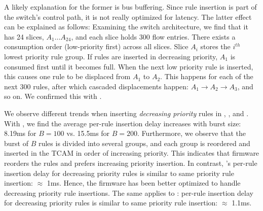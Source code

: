 A likely explanation for the former is bus buffering. Since rule insertion is
part of the switch's control path, it is not really optimized for latency.
The latter effect can be explained as follows: Examining the \Intel switch
architecture, we find that it has 24 slices, $A_1\ldots A_{24}$, and each
slice holds 300 flow entries. There exists a consumption order (low-priority
first) across all slices.  Slice $A_i$ stores the $i^{th}$ lowest
priority rule group. If rules are inserted in decreasing priority, $A_1$ is
consumed first until it becomes full. When the next low priority rule is
inserted, this causes one rule to be displaced from $A_1$ to $A_2$.  This
happens for each of the next 300 rules, after which cascaded displacements
happen: $A_1 \rightarrow A_2 \rightarrow A_3$, and so on. We confirmed this
with \Intel.

We observe different trends when inserting {\em decreasing priority} rules
in \BroadcomOne, \BroadcomThree, and \Intel. With \BroadcomOne, we find the
average per-rule insertion delay increases with burst size: 8.19ms for $B=100$
vs. 15.5ms for $B=200$. Furthermore, we observe that the burst of $B$ rules is
divided into several groups, and each group is reordered and inserted in the
TCAM in order of increasing priority. This indicates that \BroadcomOne
firmware reorders the rules and prefers increasing priority insertion.  In
contrast, \BroadcomThree's per-rule insertion delay for decreasing priority
rules is similar to same priority rule insertion: $\approx$ 1ms. Hence, the
\BroadcomThree firmware has been better optimized to handle decreasing
priority rule insertions. The same applies to \Intel: per-rule insertion delay
for decreasing priority rules is similar to same priority rule insertion:
$\approx$ 1.1ms.



